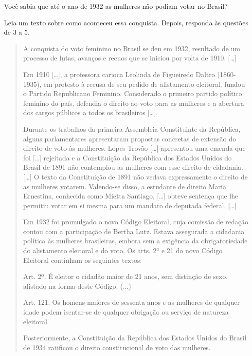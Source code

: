 \begin{mdframed}[linewidth=2pt,linecolor=salmao,roundcorner=20pt]
\vspace{18cm}
\end{mdframed}

\pagebreak
\noindent{}Você sabia que até o ano de 1932 as mulheres não podiam votar no Brasil?\bigskip

\noindent{}Leia um texto sobre como aconteceu essa conquista. Depois, responda às questões de 3 a 5.\bigskip

\begin{quote}
A conquista do voto feminino no Brasil se deu em 1932, resultado de um
processo de lutas, avanços e recuos que se iniciou por volta de 1910. {[}\ldots{}{]}

Em 1910 {[}\ldots{}{]}, a professora carioca Leolinda de Figueiredo Daltro
(1860-1935), em protesto à recusa de seu pedido de alistamento
eleitoral, fundou o Partido Republicano Feminino. Considerado o primeiro
partido político feminino do país, defendia o direito ao voto para as
mulheres e a abertura dos cargos públicos a todos os brasileiros {[}\ldots{}{]}.

Durante os trabalhos da primeira Assembleia Constituinte da República,
alguns parlamentares apresentaram propostas concretas de extensão do
direito de voto às mulheres. Lopes Trovão {[}\ldots{}{]}
 apresentou uma emenda que foi
{[}\ldots{}{]} rejeitada e a Constituição da República dos Estados Unidos do
Brasil de 1891 não contemplou as mulheres com esse direito de cidadania. {[}\ldots{}{]}
O texto da Constituição de 1891 não vedava expressamente o
direito de as mulheres votarem. Valendo-se disso, a estudante de direito
Maria Ernestina, conhecida como Mietta Santiago, {[}\ldots{}{]} obteve sentença
que lhe permitiu votar em si mesma para um mandato de deputada federal. {[}\ldots{}{]}

Em 1932 foi promulgado o novo Código Eleitoral, cuja comissão de
redação contou com a participação de Bertha Lutz. Estava assegurada a
cidadania política às mulheres brasileiras, embora sem a exigência da
obrigatoriedade do alistamento eleitoral e do voto. Os arts. 2º e 21 do
novo Código Eleitoral continham os seguintes textos:

Art. 2º. É eleitor o cidadão maior de 21 anos, sem distinção de sexo,
alistado na forma deste Código. (...)

Art. 121. Os homens maiores de sessenta anos e as mulheres de qualquer
idade podem isentar-se de qualquer obrigação ou serviço de natureza
eleitoral.

Posteriormente, a Constituição da República dos Estados Unidos do Brasil
de 1934 ratificou o direito constitucional de voto das mulheres.

\end{quote}

